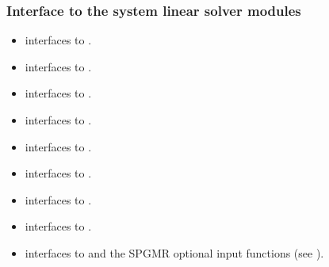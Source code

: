\documentclass[letterpaper,10pt,english]{sphinxmanual}
\begin{document}
\subsubsection{Interface to the system linear solver modules}
\label{f_interface/Routines:interface-to-the-system-linear-solver-modules}\begin{itemize}
\item {} 
{\hyperref[f_interface/Usage:f/_/FARKDENSE]{\emph{}}} interfaces to {\hyperref[c_interface/User_callable:c.ARKDense]{\emph{}}}.

\item {} 
{\hyperref[f_interface/Usage:f/_/FARKLAPACKDENSE]{\emph{}}} interfaces to {\hyperref[c_interface/User_callable:c.ARKLapackDense]{\emph{}}}.

\item {} 
{\hyperref[f_interface/Usage:f/_/FARKDENSESETJAC]{\emph{}}} interfaces to {\hyperref[c_interface/User_callable:c.ARKDlsSetDenseJacFn]{\emph{}}}.

\item {} 
{\hyperref[f_interface/Usage:f/_/FARKBAND]{\emph{}}} interfaces to {\hyperref[c_interface/User_callable:c.ARKBand]{\emph{}}}.

\item {} 
{\hyperref[f_interface/Usage:f/_/FARKLAPACKBAND]{\emph{}}} interfaces to {\hyperref[c_interface/User_callable:c.ARKLapackBand]{\emph{}}}.

\item {} 
{\hyperref[f_interface/Usage:f/_/FARKBANDSETJAC]{\emph{}}} interfaces to {\hyperref[c_interface/User_callable:c.ARKDlsSetBandJacFn]{\emph{}}}.

\item {} 
{\hyperref[f_interface/Usage:f/_/FARKKLU]{\emph{}}} interfaces to {\hyperref[c_interface/User_callable:c.ARKKLU]{\emph{}}}.

\item {} 
{\hyperref[f_interface/Usage:f/_/FARKSUPERLUMT]{\emph{}}} interfaces to {\hyperref[c_interface/User_callable:c.ARKSuperLUMT]{\emph{}}}.

\item {} 
{\hyperref[f_interface/Usage:f/_/FARKSPGMR]{\emph{}}} interfaces to {\hyperref[c_interface/User_callable:c.ARKSpgmr]{\emph{}}} and the SPGMR optional input
functions (see {\hyperref[c_interface/User_callable:cinterface-arkspilsinputtable]{\emph{}}}).


\end{itemize}
\end{document}
